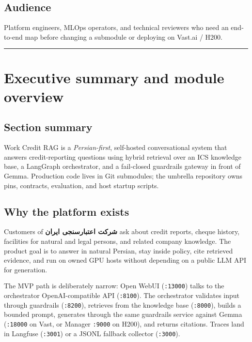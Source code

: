 \documentclass[
  11pt,
]{article}
\begin{document}
\subsection{Audience}\label{audience}

Platform engineers, MLOps operators, and technical reviewers who need an
end-to-end map before changing a submodule or deploying on Vast.ai /
H200.

\begin{center}\rule{0.5\linewidth}{0.5pt}\end{center}

\section{Executive summary and module
overview}\label{executive-summary-and-module-overview}

\subsection{Section summary}\label{section-summary}

Work Credit RAG is a \emph{Persian-first}, self-hosted conversational
system that answers credit-reporting questions using hybrid retrieval
over an ICS knowledge base, a LangGraph orchestrator, and a fail-closed
guardrails gateway in front of Gemma. Production code lives in Git
submodules; the umbrella repository owns pins, contracts, evaluation,
and host startup scripts.

\subsection{Why the platform exists}\label{why-the-platform-exists}

Customers of \textbf{شرکت اعتبارسنجی ایران} ask about credit reports,
cheque history, facilities for natural and legal persons, and related
company knowledge. The product goal is to answer in natural Persian,
stay inside policy, cite retrieved evidence, and run on owned GPU hosts
without depending on a public LLM API for generation.

The MVP path is deliberately narrow: Open WebUI (\texttt{:13000}) talks
to the orchestrator OpenAI-compatible API (\texttt{:8100}). The
orchestrator validates input through guardrails (\texttt{:8200}),
retrieves from the knowledge base (\texttt{:8000}), builds a bounded
prompt, generates through the same guardrails service against Gemma
(\texttt{:18000} on Vast, or Manager \texttt{:9000} on H200), and
returns citations. Traces land in Langfuse (\texttt{:3001}) or a JSONL
fallback collector (\texttt{:3000}).
\end{document}
